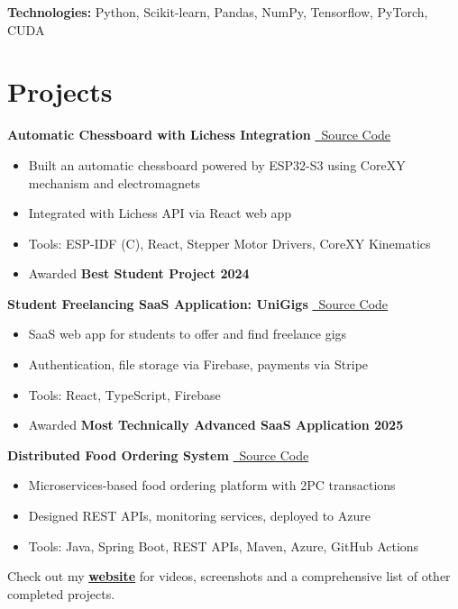 \documentclass[10pt,a4paper]{article}
\newenvironment{highlights}{\begin{itemize}}{\end{itemize}}
\begin{document}
\textbf{Technologies:} Python, Scikit-learn, Pandas, NumPy, Tensorflow, PyTorch, CUDA

\section{Projects}
\textbf{Automatic Chessboard with Lichess Integration} \hfill \href{https://github.com/Yornared/ESP32_Chessboard_code}{\faGithub\ Source Code}
\begin{highlights}
    \item Built an automatic chessboard powered by ESP32-S3 using CoreXY mechanism and electromagnets
    \item Integrated with Lichess API via React web app
    \item Tools: ESP-IDF (C), React, Stepper Motor Drivers, CoreXY Kinematics
    \item Awarded \textbf{Best Student Project 2024}
\end{highlights}

\textbf{Student Freelancing SaaS Application: UniGigs} \hfill \href{https://github.com/Yornared/FreelanceApp}{\faGithub\ Source Code}
\begin{highlights}
    \item SaaS web app for students to offer and find freelance gigs
    \item Authentication, file storage via Firebase, payments via Stripe
    \item Tools: React, TypeScript, Firebase
    \item Awarded \textbf{Most Technically Advanced SaaS Application 2025}
\end{highlights}

\textbf{Distributed Food Ordering System} \hfill \href{https://github.com/Yornared/Food-ordering-webshop}{\faGithub\ Source Code}
\begin{highlights}
    \item Microservices-based food ordering platform with 2PC transactions
    \item Designed REST APIs, monitoring services, deployed to Azure
    \item Tools: Java, Spring Boot, REST APIs, Maven, Azure, GitHub Actions
\end{highlights}

\vspace{.5cm}
Check out my \href{yornared.github.io}{\textbf{website}} for videos, screenshots and a comprehensive list of other completed projects.
\end{document}
